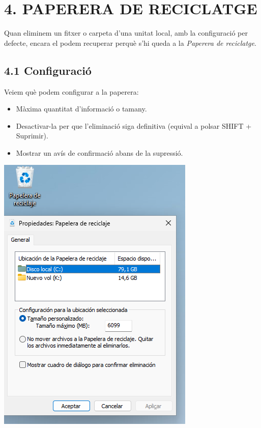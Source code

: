 \documentclass[
  a4paper,
]{article}
\providecommand{\tightlist}{%
  \setlength{\itemsep}{0pt}\setlength{\parskip}{0pt}}
\begin{document}
\section{4. PAPERERA DE RECICLATGE}\label{paperera-de-reciclatge}

Quan eliminem un fitxer o carpeta d'una unitat local, amb la
configuració per defecte, encara el podem recuperar perquè s'hi queda a
la \emph{Paperera de reciclatge}.

\subsection{4.1 Configuració}\label{configuraciuxf3}

Veiem què podem configurar a la paperera:

\begin{itemize}
\tightlist
\item
  Màxima quantitat d'informació o tamany.
\item
  Desactivar-la per que l'eliminació siga definitiva (equival a polsar
  SHIFT + Suprimir).
\item
  Mostrar un avís de confirmació abans de la supressió.
\end{itemize}

\includegraphics{png/paperera.png}
\end{document}
